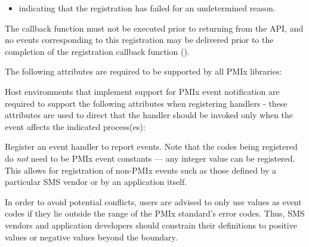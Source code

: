 \returnstart
\begin{itemize}
\item {} indicating that the registration
has failed for an undetermined reason.
\end{itemize}
\returnend

The callback function must not be executed prior to returning from the \ac{API}, and no events corresponding to this registration may be delivered prior to the completion of the registration callback function ().

\reqattrstart
The following attributes are required to be supported by all \ac{PMIx} libraries:


\divider

Host environments that implement support for \ac{PMIx} event notification are required to support the following attributes when registering handlers - these attributes are used to direct that the handler should be invoked only when the event affects the indicated process(es):


\reqattrend


\descr

Register an event handler to report events. Note that the codes being registered do \textit{not} need to be \ac{PMIx} event constants --- any integer value can be registered. This allows for registration of non-PMIx events such as those defined by a particular \ac{SMS} vendor or by an application itself.

\adviceuserstart
In order to avoid potential conflicts, users are advised to only use values as event codes if they lie outside the range of the \ac{PMIx} standard's error codes. Thus, \ac{SMS} vendors and application developers should constrain their definitions to positive values or negative values beyond the  boundary.
\adviceuserend


